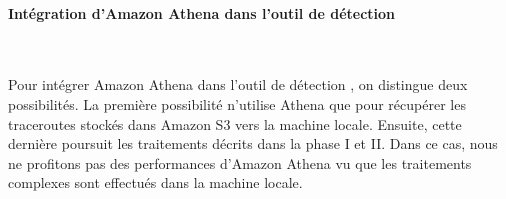 \paragraph{Intégration d'Amazon Athena dans l'outil de détection}~ \label{integration-aws-possibilite-une}


Pour intégrer Amazon Athena dans l'outil de détection \cite{InternetHealthReport}, on distingue deux possibilités. La première possibilité n'utilise Athena que pour récupérer  les traceroutes stockés dans Amazon S3 vers  la machine locale. Ensuite, cette dernière poursuit les traitements  décrits dans la phase I et II. Dans ce cas, nous ne profitons pas  des performances d'Amazon Athena vu que les traitements complexes sont effectués dans la machine locale.

